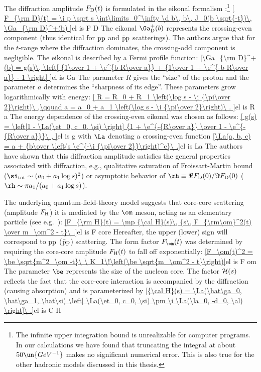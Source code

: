The diffraction amplitude $F_{\rm D}(t)$ is formulated in the eikonal formalism :\footnote{%
The infinite upper integration bound is unrealizable for computer programs. In our calculations we have found that truncating the integral at about $50\un{GeV^{-1}}$ makes no significant numerical error. This is also true for the other hadronic models discussed in this thesis.
}
\eqref{
	F_{\rm D}(t) = \i p \sqrt s \int\limits_0^\infty \d b\, b\, J_0(b \sqrt{-t})\, \Ga_{\rm D}^+(b)
}{el is F D}
The eikonal $\Ga_{\rm D}^+(b)$ represents the crossing-even component (thus identical for $\rm pp$ and $\rm\bar pp$ scatterings). The authors argue that for the $t$-range where the diffraction dominates, the crossing-odd component is negligible. The eikonal is described by a Fermi profile function:
\eqref{\Ga_{\rm D}^+(b) =
	g(s)\, \left[
		{1\over 1 + \e^{b-R\over a}}
		+ {1\over 1 + \e^{-b-R\over a}}
		- 1
	\right]
}{el is Ga}
The parameter $R$ gives the ``size'' of the proton and the parameter $a$ determines the ``sharpness of its edge''. These parameters grow logarithmically with energy:
\eqref{
	R = R_0 + R_1 \left(\log s - \i {\pi\over 2}\right)\ ,\qquad
	a = a_0 + a_1 \left(\log s - \i {\pi\over 2}\right)\ .
}{el is R a}
The energy dependence of the crossing-even eikonal was chosen as follows:
\eqref{
	g(s) =  \left[1 - \La(\et_0, c_0, \si) \right] {1 + \e^{-{R\over a}} \over 1 - \e^{- {R\over a}}}\ ,
}{el is g}
with $\La$ denoting a crossing-even function
\eqref{\La(a, b, c) = a + {b\over \left(s \e^{-\i {\pi\over 2}}\right)^c}\ .}{el is La}
The authors have shown  that this diffraction amplitude satisfies the general properties associated with diffraction, e.g., qualitative saturation of Froissart-Martin bound ($\si_{\rm tot} \sim (a_0 + a_1\log s)^2$) or asymptotic behavior of $\rh \equiv \Re F_{\rm D}(0) / \Im F_{\rm D}(0)$ ($\rh \sim \pi a_1 / (a_0 + a_1 \log s)$).

The underlying quantum-field-theory model suggests that core-core scattering (amplitude $F_{\rm H}$) it is mediated by the $\rm\om$ meson, acting as an elementary particle (see e.g.~):
\eqref{F_{\rm H}(t) = \mp {\cal H}(s)\, {s\, F_{\rm\om}^2(t) \over m_\om^2 - t}\ .}{el is F core}
Hereafter, the upper (lower) sign will correspond to $\rm pp$ ($\rm\bar pp$) scattering. The form factor $F_\om(t)$ was determined by requiring the core-core amplitude $F_{\rm H}(t)$ to fall off exponentially:
\eqref{F_\om(t)^2 = \be \sqrt{m^2_\om -t}\ \ K_1\!\left(\be \sqrt{m_\om^2 - t}\right)}{el is F om}
The parameter $\be$ represents the size of the nucleon core. The factor ${\cal H}(s)$ reflects the fact that the core-core interaction is accompanied by the diffraction (causing absorption) and is parameterized by
\eqref{{\cal H}(s) = \La(\hat\ga_0, \hat\ga_1, \hat\si) \left[ \La(\et_0, c_0, \si) \pm \i \La(\la_0, -d_0, \al) \right]\ .}{el is C H}

